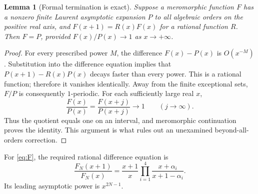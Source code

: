 \documentclass[11pt,a4paper]{article}
\numberwithin{equation}{section}
\newtheorem{lemma}[theorem]{Lemma}
\theoremstyle{definition}\newtheorem{definition}[theorem]{Definition}
\theoremstyle{remark}\newtheorem{remark}[theorem]{Remark}
\begin{document}
\begin{lemma}[Formal termination is exact]
\label{lem:formal-exact}
Suppose a meromorphic function $F$ has a nonzero finite Laurent
asymptotic expansion $P$ to all algebraic orders on the positive real
axis, and $F(x+1)=R(x)F(x)$ for a rational function $R$. Then $F=P$,
provided $F(x)/P(x)\to1$ as $x\to+\infty$.
\end{lemma}
\begin{proof}
For every prescribed power $M$, the difference $F(x)-P(x)$ is
$O(x^{-M})$. Substitution into the difference equation implies that
$P(x+1)-R(x)P(x)$ decays faster than every power. This is a rational
function; therefore it vanishes identically. Away from the finite
exceptional sets, $F/P$ is consequently $1$-periodic. For each
sufficiently large real $x$,
\[
 \frac{F(x)}{P(x)}=\frac{F(x+j)}{P(x+j)}\longrightarrow1
 \qquad(j\to\infty).
\]
Thus the quotient equals one on an interval, and meromorphic
continuation proves the identity. This argument is what rules out
an unexamined beyond-all-orders correction.
\end{proof}

For \eqref{eq:F}, the required rational difference equation is
\begin{equation}
 \frac{F_N(x+1)}{F_N(x)}
 =\frac{x+1}{x}\prod_{i=1}^4\frac{x+\alpha_i}{x+1-\alpha_i}.
 \label{eq:difference}
\end{equation}
Its leading asymptotic power is $x^{2N-1}$.
\end{document}
